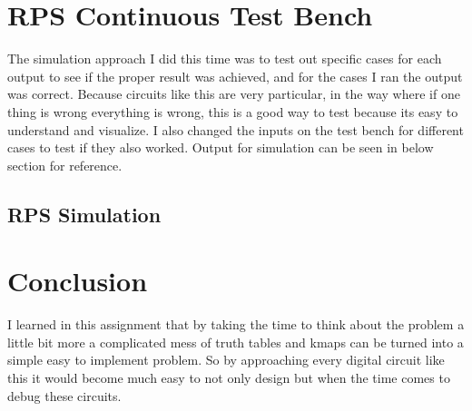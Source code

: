 \documentclass{article}
\begin{document}
\section{RPS Continuous Test Bench}
\begin{center}
\end{center}

The simulation approach I did this time was to test out specific cases for each output to see if the proper result was achieved, and for the cases I ran the output was correct. Because circuits like this are very particular, in the way where if one thing is wrong everything is wrong, this is a good way to test because its easy to understand and visualize. I also changed the inputs on the test bench for different cases to test if they also worked. Output for simulation can be seen in below section for reference.

\subsection{RPS Simulation}

\begin{center}
\end{center}


\section{Conclusion}

I learned in this assignment that by taking the time to think about the problem a little bit more a complicated mess of truth tables and kmaps can be turned into a simple easy to implement problem. So by approaching every digital circuit like this it would become much easy to not only design but when the time comes to debug these circuits.
\end{document}
